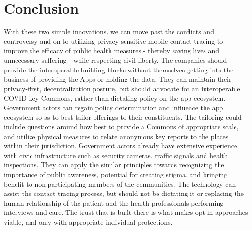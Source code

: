 \section{Conclusion}
With these two simple innovations, we can move past the conflicts and controversy and on to utilizing privacy-sensitive mobile contact tracing to improve the efficacy of public health measures - thereby saving lives and unnecessary suffering - while respecting civil liberty.  The companies should provide the interoperable building blocks without themselves getting into the business of providing the Apps or holding the data.  They can maintain their privacy-first, decentralization posture, but should advocate for an interoperable COVID key Commons, rather than dictating policy on the app ecosystem.  Government actors can regain policy determination and influence the app ecosystem so as to best tailor offerings to their constituents. The tailoring could include questions around how best to provide a Commons of appropriate scale, and utilize physical measures to relate anonymous key reports to the places within their jurisdiction. Government actors already have extensive experience with civic infrastructure such as security cameras, traffic signals and health inspections. They can apply the similar principles towards recognizing the importance of public awareness, potential for creating stigma, and bringing benefit to non-participating members of the communities.  The technology can assist the contact tracing process, but should not be dictating it or replacing the human relationship of the patient and the health professionals performing interviews and care.  The trust that is built there is what makes opt-in approaches viable, and only with appropriate individual protections.